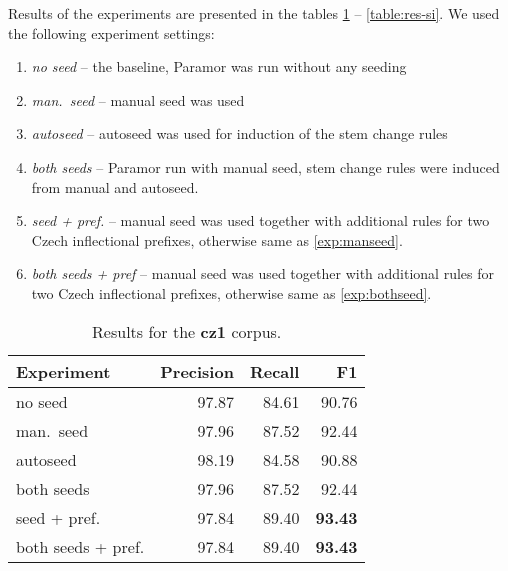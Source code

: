 \documentclass{itatnew}
\newcommand{\e}[1]{\textit{#1}} %
\begin{document}
\noindent
Results of the experiments are presented in the tables \ref{table:res-cz1} -- \ref{table:res-si}. We used the following experiment settings:\begin{enumerate}
\item \e{no seed} -- the baseline, Paramor was run without any seeding
\item \label{exp:manseed} \e{man.~seed} -- manual seed was used
\item \e{autoseed} -- autoseed was used for induction of the stem change rules
\item \label{exp:bothseed}
    \e{both seeds} -- Paramor run with manual seed, stem change rules were induced from manual and autoseed.
\item \e{seed + pref.} -- manual seed was used together with additional rules for two Czech inflectional prefixes, otherwise same as \ref{exp:manseed}.
\item \e{both seeds + pref} --  manual seed was used together with additional rules for two Czech inflectional prefixes, otherwise same as \ref{exp:bothseed}.
\end{enumerate}

\begin{table}[h]
\begin{center}
\begin{tabular}{|l|r|r|r|}
\hline \bf Experiment & \bf Precision & \bf Recall & \bf F1\\ \hline
no seed &  97.87 & 84.61 & 90.76 \\
man.~seed & 97.96 &  87.52 & 92.44 \\
autoseed & 98.19 & 84.58 & 90.88\\
both seeds & 97.96 & 87.52 & 92.44\\
seed + pref. & 97.84 & 89.40 & \bf 93.43\\
both seeds + pref.& 97.84 & 89.40 & \bf 93.43 \\
\hline
\end{tabular}
\end{center}
\caption{\label{table:res-cz1} Results for the \textbf{cz1} corpus.}
\end{table}
\end{document}
